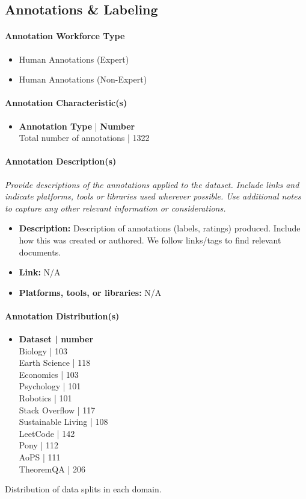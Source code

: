 \subsection{Annotations \& Labeling}
\paragraph{Annotation Workforce Type}
\begin{itemize}
    \item Human Annotations (Expert)
    \item Human Annotations (Non-Expert)
\end{itemize}

\paragraph{Annotation Characteristic(s)}
\begin{itemize}
    \item \textbf{Annotation Type} | \textbf{Number} \\
    Total number of annotations | 1322
\end{itemize}

\paragraph{Annotation Description(s)}
\textit{Provide descriptions of the annotations applied to the dataset. Include links and indicate platforms, tools or libraries used wherever possible. Use additional notes to capture any other relevant information or considerations.}
\begin{itemize}
    \item \textbf{Description:} Description of annotations (labels, ratings) produced. Include how this was created or authored. We follow links/tags to find relevant documents.
    \item \textbf{Link:} N/A
    \item \textbf{Platforms, tools, or libraries:} N/A
\end{itemize}

\paragraph{Annotation Distribution(s)}
\begin{itemize}
    \item \textbf{Dataset | number} \\
    Biology | 103 \\
    Earth Science | 118 \\
    Economics | 103 \\
    Psychology | 101 \\
    Robotics | 101 \\
    Stack Overflow | 117 \\
    Sustainable Living | 108 \\
    LeetCode | 142 \\
    Pony | 112 \\
    AoPS | 111 \\
    TheoremQA | 206
\end{itemize}
Distribution of data splits in each domain.

